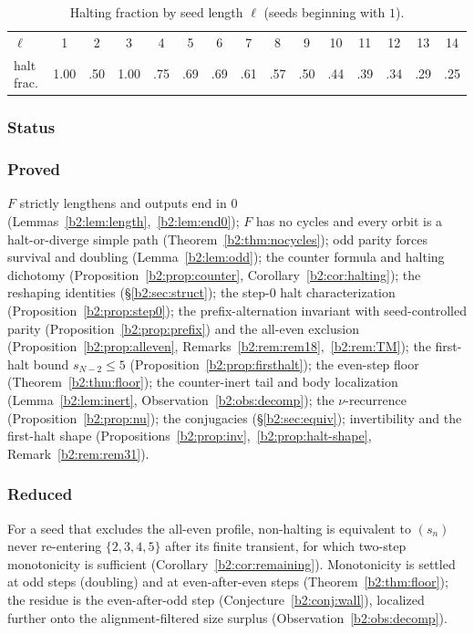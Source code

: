 \documentclass[a4paper]{article}
\theoremstyle{plain}
\theoremstyle{definition}
\theoremstyle{remark}
\begin{document}
\begin{table}[H]\centering
\begin{tabular}{l|cccccccccccccc}
$\ell$ & 1 & 2 & 3 & 4 & 5 & 6 & 7 & 8 & 9 & 10 & 11 & 12 & 13 & 14\\
halt frac. & 1.00 & .50 & 1.00 & .75 & .69 & .69 & .61 & .57 & .50 & .44 & .39 & .34 & .29 & .25
\end{tabular}
\caption{Halting fraction by seed length $\ell$ (seeds beginning with $1$).}
\label{b2:tab:bylength}
\end{table}

\subsubsection{Status}\label{b2:sec:status}
\subsubsection*{Proved} $F$ strictly lengthens and outputs end in $0$ (Lemmas~\ref{b2:lem:length},~\ref{b2:lem:end0}); $F$ has no cycles and every orbit is a halt-or-diverge simple path (Theorem~\ref{b2:thm:nocycles}); odd parity forces survival and doubling (Lemma~\ref{b2:lem:odd}); the counter formula and halting dichotomy (Proposition~\ref{b2:prop:counter}, Corollary~\ref{b2:cor:halting}); the reshaping identities (\S\ref{b2:sec:struct}); the step-$0$ halt characterization (Proposition~\ref{b2:prop:step0}); the prefix-alternation invariant with seed-controlled parity (Proposition~\ref{b2:prop:prefix}) and the all-even exclusion (Proposition~\ref{b2:prop:alleven}, Remarks~\ref{b2:rem:rem18},~\ref{b2:rem:TM}); the first-halt bound $s_{N-2}\le 5$ (Proposition~\ref{b2:prop:firsthalt}); the even-step floor (Theorem~\ref{b2:thm:floor}); the counter-inert tail and body localization (Lemma~\ref{b2:lem:inert}, Observation~\ref{b2:obs:decomp}); the $\nu$-recurrence (Proposition~\ref{b2:prop:nu}); the conjugacies (\S\ref{b2:sec:equiv}); invertibility and the first-halt shape (Propositions~\ref{b2:prop:inv},~\ref{b2:prop:halt-shape}, Remark~\ref{b2:rem:rem31}).

\subsubsection*{Reduced} For a seed that excludes the all-even profile, non-halting is equivalent to $(s_n)$ never re-entering $\{2,3,4,5\}$ after its finite transient, for which two-step monotonicity is sufficient (Corollary~\ref{b2:cor:remaining}). Monotonicity is settled at odd steps (doubling) and at even-after-even steps (Theorem~\ref{b2:thm:floor}); the residue is the even-after-odd step (Conjecture~\ref{b2:conj:wall}), localized further onto the alignment-filtered size surplus (Observation~\ref{b2:obs:decomp}).
\end{document}
